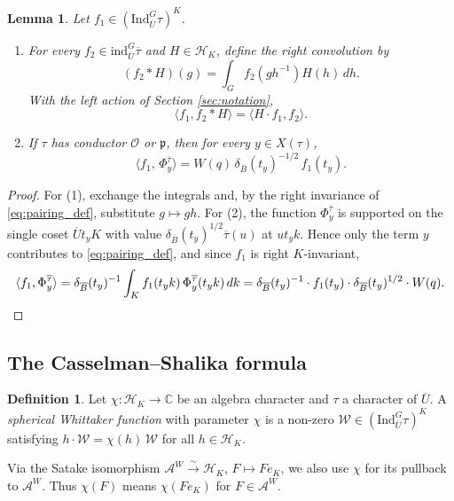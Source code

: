 \documentclass[12pt]{article}
\numberwithin{equation}{section}
\newtheorem{lemma}[theorem]{Lemma}
\theoremstyle{definition}
\newtheorem{definition}[theorem]{Definition}
\theoremstyle{remark}
\theoremstyle{plain}
\begin{document}
\begin{lemma}\label{lem:pairing}
Let $f_1 \in (\mathrm{Ind}_{\overline{U}}^G \tau)^K$.
\begin{enumerate}
\item For every $f_2 \in \mathrm{ind}_{\overline{U}}^G \overline{\tau}$ and $H \in \mathcal{H}_K$, define the right convolution by
$$ (f_2 * H)(g) = \int_G f_2(gh^{-1})H(h)\,dh. $$
With the left action of Section \ref{sec:notation},
$$\langle f_1, f_2 * H \rangle = \langle H \cdot f_1, f_2 \rangle.$$
\item If $\tau$ has conductor $\mathcal{O}$ or $\mathfrak{p}$, then for every $y\in X(\tau)$,
$$\big\langle f_1,\, \Phi^{\overline{\tau}}_y \big\rangle = W(q)\,\delta_{\overline{B}}(t_y)^{-1/2}\, f_1(t_y).$$
\end{enumerate}
\end{lemma}
\begin{proof}
For (1), exchange the integrals and, by the right invariance of \eqref{eq:pairing_def}, substitute $g \mapsto gh$. For (2), the function $\Phi^{\overline{\tau}}_y$ is supported on the single coset $\overline{U}t_yK$ with value $\delta_{\overline{B}}(t_y)^{1/2}\overline{\tau}(u)$ at $ut_yk$. Hence only the term $y$ contributes to \eqref{eq:pairing_def}, and since $f_1$ is right $K$-invariant,
\[\langle f_1, \Phi^{\overline{\tau}}_y \rangle = \delta_{\overline{B}}(t_y)^{-1}\int_K f_1(t_yk)\,\Phi^{\overline{\tau}}_y(t_yk)\,dk = \delta_{\overline{B}}(t_y)^{-1}\cdot f_1(t_y)\cdot \delta_{\overline{B}}(t_y)^{1/2}\cdot W(q). \qedhere\]
\end{proof}

\subsection{The Casselman--Shalika formula}

\begin{definition}
Let $\chi : \mathcal{H}_K \to \mathbb{C}$ be an algebra character and $\tau$ a character of $\overline{U}$. A \emph{spherical Whittaker function} with parameter $\chi$ is a non-zero $\mathcal{W} \in (\mathrm{Ind}_{\overline{U}}^G \tau)^K$ satisfying $h \cdot \mathcal{W} = \chi(h)\, \mathcal{W}$ for all $h \in \mathcal{H}_K$.
\end{definition}

Via the Satake isomorphism $\mathcal A^W \xrightarrow{\sim} \mathcal H_K$, $F \mapsto Fe_K$, we also use $\chi$ for its pullback to $\mathcal A^W$. Thus $\chi(F)$ means $\chi(Fe_K)$ for $F \in \mathcal A^W$.
\end{document}
